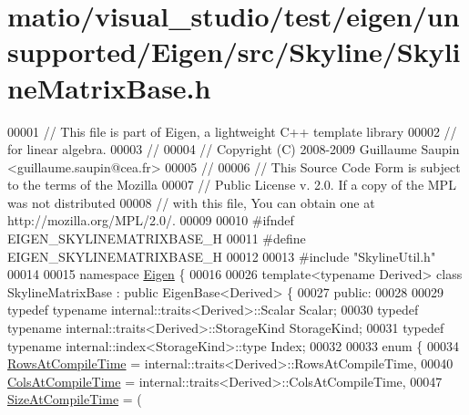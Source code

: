 \hypertarget{matio_2visual__studio_2test_2eigen_2unsupported_2_eigen_2src_2_skyline_2_skyline_matrix_base_8h_source}{}\section{matio/visual\+\_\+studio/test/eigen/unsupported/\+Eigen/src/\+Skyline/\+Skyline\+Matrix\+Base.h}
\label{matio_2visual__studio_2test_2eigen_2unsupported_2_eigen_2src_2_skyline_2_skyline_matrix_base_8h_source}

\begin{DoxyCode}
00001 \textcolor{comment}{// This file is part of Eigen, a lightweight C++ template library}
00002 \textcolor{comment}{// for linear algebra.}
00003 \textcolor{comment}{//}
00004 \textcolor{comment}{// Copyright (C) 2008-2009 Guillaume Saupin <guillaume.saupin@cea.fr>}
00005 \textcolor{comment}{//}
00006 \textcolor{comment}{// This Source Code Form is subject to the terms of the Mozilla}
00007 \textcolor{comment}{// Public License v. 2.0. If a copy of the MPL was not distributed}
00008 \textcolor{comment}{// with this file, You can obtain one at http://mozilla.org/MPL/2.0/.}
00009 
00010 \textcolor{preprocessor}{#ifndef EIGEN\_SKYLINEMATRIXBASE\_H}
00011 \textcolor{preprocessor}{#define EIGEN\_SKYLINEMATRIXBASE\_H}
00012 
00013 \textcolor{preprocessor}{#include "SkylineUtil.h"}
00014 
00015 \textcolor{keyword}{namespace }\hyperlink{namespace_eigen}{Eigen} \{ 
00016 
00026 \textcolor{keyword}{template}<\textcolor{keyword}{typename} Derived> \textcolor{keyword}{class }SkylineMatrixBase : \textcolor{keyword}{public} EigenBase<Derived> \{
00027 \textcolor{keyword}{public}:
00028 
00029     \textcolor{keyword}{typedef} \textcolor{keyword}{typename} internal::traits<Derived>::Scalar Scalar;
00030     \textcolor{keyword}{typedef} \textcolor{keyword}{typename} internal::traits<Derived>::StorageKind StorageKind;
00031     \textcolor{keyword}{typedef} \textcolor{keyword}{typename} internal::index<StorageKind>::type Index;
00032 
00033     \textcolor{keyword}{enum} \{
00034         \hyperlink{class_eigen_1_1_skyline_matrix_base_a811ba3961cb927ae5fa84ed278ebceeaa22b71b821112b0ccf61b7317b9ac4cf4}{RowsAtCompileTime} = internal::traits<Derived>::RowsAtCompileTime,
00040         \hyperlink{class_eigen_1_1_skyline_matrix_base_a811ba3961cb927ae5fa84ed278ebceeaa0bb8b9ae248b86ca53aff754311111e8}{ColsAtCompileTime} = internal::traits<Derived>::ColsAtCompileTime,
00047         \hyperlink{class_eigen_1_1_skyline_matrix_base_a811ba3961cb927ae5fa84ed278ebceeaacd91cb554fe479f85ab5749902d89217}{SizeAtCompileTime} = (

\end{DoxyCode}
